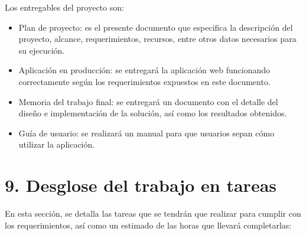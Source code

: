 \documentclass[
11pt, %
codirector, %
]{charter}
\begin{document}
Los entregables del proyecto son:

\begin{itemize}
	\item Plan de proyecto: es el presente documento que especifica la descripción del proyecto, alcance, requerimientos, recursos, entre otros datos necesarios para su ejecución.
	\item Aplicación en producción: se entregará la aplicación web funcionando correctamente según los requerimientos expuestos en este documento.
	\item Memoria del trabajo final: se entregará un documento con el detalle del diseño e implementación de la solución, así como los resultados obtenidos.
	\item Guía de usuario: se realizará un manual para que usuarios sepan cómo utilizar la aplicación.
\end{itemize}

\section{9. Desglose del trabajo en tareas}
\label{sec:wbs}

En esta sección, se detalla las tareas que se tendrán que realizar para cumplir con los requerimientos, así como un estimado de las horas que llevará completarlas:
\end{document}
